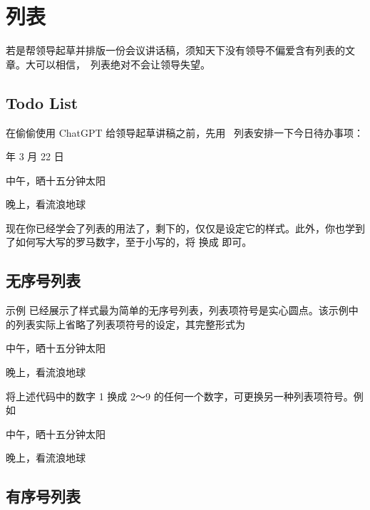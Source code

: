 \chapter{列表}

若是帮领导起草并排版一份会议讲话稿，须知天下没有领导不偏爱含有列表的文章。大可以相信，\ConTeXt\ 列表绝对不会让领导失望。

\section{Todo List}

在偷偷使用 ChatGPT 给领导起草讲稿之前，先用 \ConTeXt\ 列表安排一下今日待办事项：

\startsamplecode{} 年 3 月 22 日
\startitemize
\item 中午，晒十五分钟太阳
\item 晚上，看流浪地球 \Romannumerals[2]
\stopitemize
\stopnarrowtyping\stopsamplecode
{}

现在你已经学会了列表的用法了，剩下的，仅仅是设定它的样式。此外，你也学到了如何写大写的罗马数字，至于小写的，将 \type{\Romannumerals} 换成 \type{\romannumerals} 即可。

\section{无序号列表}

示例  已经展示了样式最为简单的无序号列表，列表项符号是实心圆点。该示例中的列表实际上省略了列表项符号的设定，其完整形式为

\starttyping[option=TEX]
\startitemize[1]
\item 中午，晒十五分钟太阳
\item 晚上，看流浪地球 \Romannumerals[2]
\stopitemize
\stoptyping

将上述代码中的数字 1 换成 2～9 的任何一个数字，可更换另一种列表项符号。例如

\startsamplecode\startnarrowtyping
\startitemize[8]
\item 中午，晒十五分钟太阳
\item 晚上，看流浪地球 \Romannumerals[2]
\stopitemize
\stopnarrowtyping\stopsamplecode
{}

\section{有序号列表}


